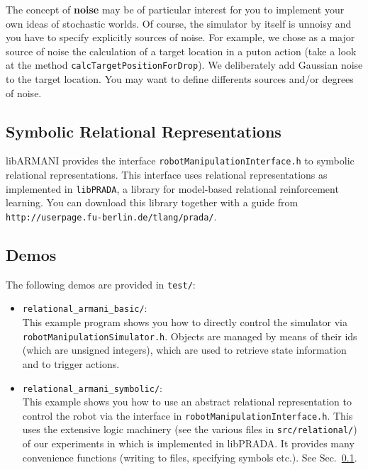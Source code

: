 \documentclass[10pt,twoside,twocolumn,fleqn]{article}
\begin{document}
The concept of \textbf{noise} may be of particular interest for you to
implement your own ideas of stochastic worlds. Of course, the
simulator by itself is unnoisy and you have to specify explicitly
sources of noise. For example, we chose as a major source of noise the
calculation of a target location in a puton action (take a look at the
method \texttt{calcTargetPositionForDrop}). We deliberately add Gaussian
noise to the target location. You may want to define differents sources
and/or degrees of noise.




\subsection{Symbolic Relational Representations}
\label{programmerGuide:logic}

libARMANI provides the interface \texttt{robotManipulationInterface.h}
to symbolic relational representations. This interface uses relational
representations as implemented in \texttt{libPRADA}, a library for
model-based relational reinforcement learning. You can download this
library together with a guide from
\texttt{http://userpage.fu-berlin.de/tlang/prada/}.



\subsection{Demos}

The following demos are provided in \texttt{test/}:

\begin{itemize}
\item \texttt{relational\_armani\_basic/}: \\
This example program shows you how to directly control the simulator via
\texttt{robotManipulationSimulator.h}. Objects are managed by means
of their ids (which are unsigned integers), which are used to retrieve
state information and to trigger actions.

\item \texttt{relational\_armani\_symbolic/}: \\
This example shows you how to use an abstract relational
representation to control the robot via the interface in
\texttt{robotManipulationInterface.h}. This uses the extensive logic
machinery (see the various files in \texttt{src/relational/}) of our
experiments in \cite{lang-toussaint-10jair} which is implemented in
libPRADA. It provides many convenience functions (writing to files,
specifying symbols etc.). See Sec.~\ref{programmerGuide:logic}.
\end{itemize}
\end{document}
